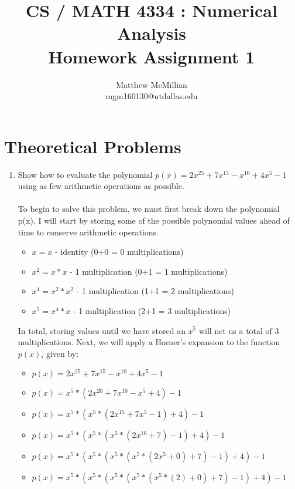 \documentclass[12pt]{article}
\begin{document}
\title{CS / MATH 4334 : Numerical Analysis\\Homework Assignment 1}
\author{Matthew McMillian\\mgm160130@utdallas.edu}
\maketitle

\section*{Theoretical Problems}

\begin{enumerate}

	\item Show how to evaluate the polynomial \(p(x) = 2x^{25} + 7x^{15} - x^{10} + 4x^{5} - 1\) using as few arithmetic operations as possible. \\ \\
	To begin to solve this problem, we must first break down the polynomial p(x). I will start by storing some of the possible polynomial values ahead of time to conserve arithmetic operations.
	
	\begin{itemize}
		\item[] \(x = x\) \tabto{6cm} - identity \tabto{10cm} (0+0 = 0 multiplications)
		\item[] \(x^2 = x * x\) \tabto{6cm} - 1 multiplication  \tabto{10cm} (0+1 = 1 multiplications)
		\item[] \(x^4 = x^2 * x^2\) \tabto{6cm} - 1 multiplication \tabto{10cm} (1+1 = 2 multiplications)
		\item[] \(x^5 = x^4 * x\) \tabto{6cm} - 1 multiplication \tabto{10cm} (2+1 = 3 multiplications)
	\end{itemize}
	
In total, storing values until we have stored an \(x^5\) will net us a total of 3 multiplications. Next, we will apply a Horner's expansion to the function \(p(x)\), given by:	
	
	\begin{itemize}
		\item[] \(p(x) = 2x^{25} + 7x^{15} - x^{10} + 4x^{5} - 1\)
		\item[] \(p(x) = x^5 * (2x^{20}  +7x^{10} - x^5 + 4) - 1\)
		\item[] \(p(x) = x^5 * ( x^5 * ( 2x^{15} + 7x^5 - 1) + 4) -1\)
		\item[] \(p(x) = x^5 * (x^5 * (x^5 * (2x^{10} + 7 ) - 1 ) +4 ) - 1\)
		\item[] \(p(x) = x^5 * (x^5 * (x^5 *( x^5 *(2x^5 + 0) +7) -1)+4)-1\)
		\item[] \(p(x) = x^5 * (x^5 * (x^5 *( x^5 *(x^5 * (2) + 0) +7) -1)+4)-1\)
	\end{itemize}
		

\end{enumerate}
\end{document}
